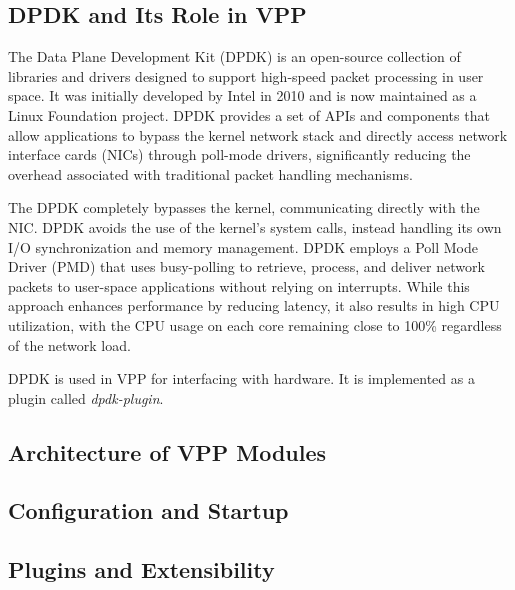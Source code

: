 \subsection{DPDK and Its Role in VPP}

The Data Plane Development Kit (DPDK) is an open-source collection of libraries and drivers designed to support high-speed packet processing in user space. 
It was initially developed by Intel in 2010 and is now maintained as a Linux Foundation project. 
DPDK provides a set of APIs and components that allow applications to bypass the kernel network stack and directly access network interface cards (NICs) 
through poll-mode drivers, significantly reducing the overhead associated with traditional packet handling mechanisms.\cite{dpdk_about}

The DPDK completely bypasses the kernel, communicating directly with the NIC.
DPDK avoids the use of the kernel’s system calls, instead handling its own I/O synchronization and memory management. 
DPDK employs a Poll Mode Driver (PMD) that uses busy-polling to retrieve, process, and deliver network packets to user-space applications without relying on interrupts. 
While this approach enhances performance by reducing latency, it also results in high CPU utilization, with the CPU usage on each core remaining close to 100\% regardless of the network load.\cite{FREITAS2022148}

DPDK is used in VPP for interfacing with hardware. It is implemented as a plugin called \textit{dpdk-plugin}.\cite{LINGUAGLOSSA, DR:COMMAG-18} 

\subsection{Architecture of VPP Modules}
\subsection{Configuration and Startup}
\subsection{Plugins and Extensibility}

